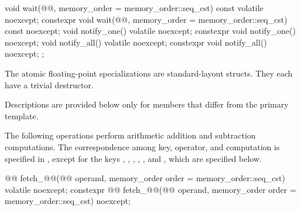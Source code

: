 \begin{codeblock}
{{    void wait(@@, memory_order = memory_order::seq_cst) const volatile noexcept;
    constexpr void wait(@@,
                        memory_order = memory_order::seq_cst) const noexcept;
    void notify_one() volatile noexcept;
    constexpr void notify_one() noexcept;
    void notify_all() volatile noexcept;
    constexpr void notify_all() noexcept;
  };
}
\end{codeblock}

\pnum
The atomic floating-point specializations
are standard-layout structs.
They each have
a trivial destructor.

\pnum
Descriptions are provided below only for members that differ from the primary template.

\pnum
The following operations perform arithmetic addition and subtraction computations.
The correspondence among key, operator, and computation is specified
in ,
except for the keys
,
,
,
,
, and
,
which are specified below.

%
%
%
%
%
%
%
%
%
%
%
%
\begin{itemdecl}
@@ fetch_@@(@@ operand,
                              memory_order order = memory_order::seq_cst) volatile noexcept;
constexpr @@ fetch_@@(@@ operand,
                                        memory_order order = memory_order::seq_cst) noexcept;
\end{itemdecl}

